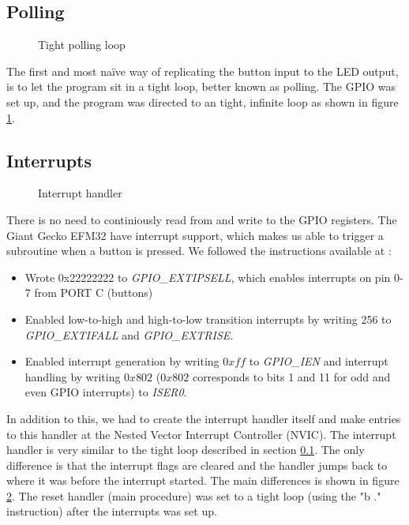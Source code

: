	\subsection{Polling}
	\label{subsection:polling}
	\begin{figure}[t]
		
		\caption{Tight polling loop}
		\label{code:polling_loop}
	\end{figure}
	The first and most naïve way of replicating the button input to the LED output, is to let the program sit in a tight loop, better known as polling. The GPIO was set up, and the program was directed to an tight, infinite loop as shown in figure \ref{code:polling_loop}.

	\subsection{Interrupts}
	\label{subsection:interrupts}
	\begin{figure}[t]
		
		\caption{Interrupt handler}
		\label{code:interrupt_handler}
	\end{figure}
	There is no need to continiously read from and write to the GPIO registers. The Giant Gecko EFM32 have interrupt support, which makes us able to trigger a subroutine when a button is pressed. We followed the instructions available at \cite[p. 24]{compendium}:
	\begin{itemize}
		\item Wrote 0x22222222 to \emph{GPIO\_EXTIPSELL}, which enables interrupts on pin 0-7 from PORT C (buttons) \cite[p. 770]{reference_manual}
		\item Enabled low-to-high and high-to-low transition interrupts by writing 256 to \emph{GPIO\_EXTIFALL} and \emph{GPIO\_EXTRISE}.
		\item Enabled interrupt generation by writing $0xff$ to \emph{GPIO\_IEN} and interrupt handling by writing $0x802$ ($0x802$ corresponds to bits 1 and 11 for odd and even GPIO interrupts) to \emph{ISER0}.
	\end{itemize}
	
	


In addition to this, we had to create the interrupt handler itself and make entries to this handler at the Nested Vector Interrupt Controller (NVIC). The interrupt handler is very similar to the tight loop described in section \ref{subsection:polling}. The only difference is that the interrupt flags are cleared and the handler jumps back to where it was before the interrupt started. The main differences is shown in figure \ref{code:interrupt_handler}. The reset handler (main procedure) was set to a tight loop (using the "b ." instruction) after the interrupts was set up.

